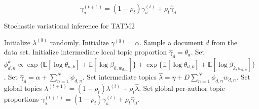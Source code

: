 \begin{equation}
\gamma^{(t+1)}_a = (1 - \rho_t) \gamma^{(t)}_a + \rho_t \hat{\gamma}_d
\end{equation}




\begin{algorithm}[tb]
\caption{Stochastic variational inference for TATM2}
\label{alg:stoch_tatm2}
\begin{algorithmic}[1]
	\STATE Initialize $\lambda^{(0)}$ randomly.
	\STATE Initialize $\gamma^{(0)} = \alpha$.
	\REPEAT
	\STATE Sample a document $d$ from the data set.
	\STATE Initialize intermediate local topic proportion $\hat{\gamma}_d = \theta_{a}$.
		\REPEAT
					\STATE Set $\phi^k_{d,n} \propto \exp \{ \mathbb{E}[\log \theta_{a,k}] + \mathbb{E}[\log \beta_{k,w_{d,n}}] \} + \exp \{ \mathbb{E}[\log \theta_{d,k}] + \mathbb{E}[\log \beta_{k,w_{d,n}}] \}$.
			\ENDFOR
			\STATE Set $\hat{\gamma}_d = \alpha + \sum_{n=1}^{N}{\phi_{d,n}}$.
		\STATE Set intermediate topics $\hat{\lambda} = \eta + D \sum_{n=1}^{N}{\phi_{d,n}w_{d,n}}$.
		\STATE Set global topics $\lambda^{(t+1)} = (1 - \rho_t) \lambda^{(t)} + \rho_t \hat{\lambda}$.
		\STATE Set global per-author topic proportions $\gamma^{(t+1)}_a = (1 - \rho_t) \gamma^{(t)}_a + \rho_t \hat{\gamma}_d$.
\end{algorithmic}
\end{algorithm}
